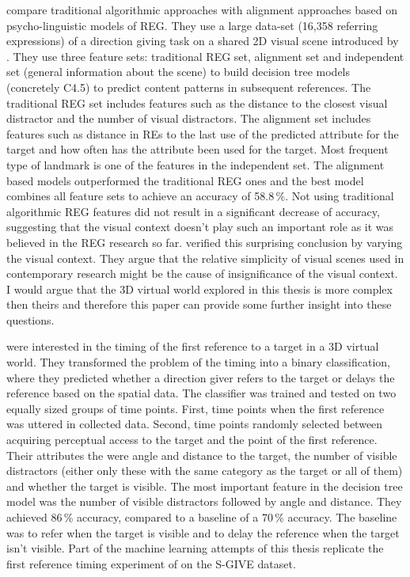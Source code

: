 \citet{viethen2011generating} compare traditional algorithmic approaches with alignment approaches based on psycho-linguistic models of REG. They use a large data-set (16,358 referring expressions) of a direction giving task on a shared 2D visual scene introduced by \citet{louwerse2007multimodal}. They use three feature sets: traditional REG set, alignment set and independent set (general information about the scene) to build decision tree models (concretely C4.5) to predict content patterns in subsequent references. The traditional REG set includes features such as the distance to the closest visual distractor and the number of visual distractors. The alignment set includes features such as distance in REs to the last use of the predicted attribute for the target and how often has the attribute been used for the target. Most frequent type of landmark is one of the features in the independent set. The alignment based models outperformed the traditional REG ones and the best model combines all feature sets to achieve an accuracy of 58.8\,\%. Not using traditional algorithmic REG features did not result in a significant decrease of accuracy, suggesting that the visual context doesn't play such an important role as it was believed in the REG research so far.  \citet{viethen2011impact} verified this surprising conclusion by varying the visual context. They argue that the relative simplicity of visual scenes used in contemporary research might be the cause of insignificance of the visual context. I would argue that the 3D virtual world explored in this thesis is more complex then theirs and therefore this paper can provide some further insight into these questions.  

\citet{stoia2006sentence} were interested in the timing of the first reference to a target in a 3D virtual world. They transformed the problem of the timing into a binary classification, where they predicted whether a direction giver refers to the target or delays the reference based on the spatial data. The classifier was trained and tested on two equally sized groups of time points. First, time points when the first reference was uttered in collected data. Second, time points randomly selected between acquiring perceptual access to the target and the point of the first reference. Their attributes the were angle and distance to the target, the number of visible distractors (either only these with the same category as the target or all of them) and whether the target is visible. The most important feature in the decision tree model was the number of visible distractors followed by angle and distance. They achieved 86\,\% accuracy, compared to a baseline of a 70\,\% accuracy. The baseline was to refer when the target is visible and to delay the reference when the target isn't visible. Part of the machine learning attempts of this thesis replicate the first reference timing experiment of \citet{stoia2006sentence} on the S-GIVE dataset.

